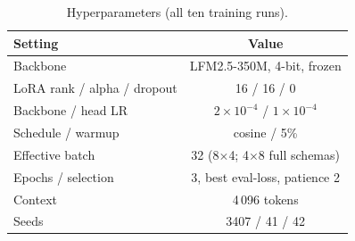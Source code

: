\begin{table}[htbp]
\caption{Hyperparameters (all ten training runs).}
\label{tab:hyper}
\begin{center}
\setlength{\tabcolsep}{4pt}
\begin{small}
\begin{tabular}{lc}
\toprule
Setting & Value \\
\midrule
Backbone & LFM2.5-350M, 4-bit, frozen \\
LoRA rank / alpha / dropout & 16 / 16 / 0 \\
Backbone / head LR & $2\times10^{-4}$ / $1\times10^{-4}$ \\
Schedule / warmup & cosine / 5\% \\
Effective batch & 32 (8$\times$4; 4$\times$8 full schemas) \\
Epochs / selection & 3, best eval-loss, patience 2 \\
Context & 4\,096 tokens \\
Seeds & 3407 / 41 / 42 \\
\bottomrule
\end{tabular}
\end{small}
\end{center}
\end{table}

